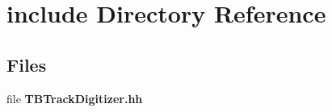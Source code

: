 \section{include Directory Reference}
\label{dir_43016178943f654b6f4640eaee3ab8a7}
\subsection*{Files}
\begin{DoxyCompactItemize}
\item 
file {\bfseries T\-B\-Track\-Digitizer.\-hh}
\end{DoxyCompactItemize}
